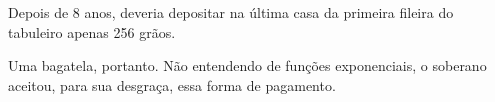 \documentclass[../main.tex]{subfiles}
\begin{document}
\begin{ex}
Depois de 8 anos, deveria depositar na última casa da primeira fileira do tabuleiro apenas 256 grãos.
 
Uma bagatela, portanto.  Não entendendo de funções  exponenciais, o soberano aceitou, para sua desgraça, essa forma de pagamento.

\end{ex}

\end{document}
